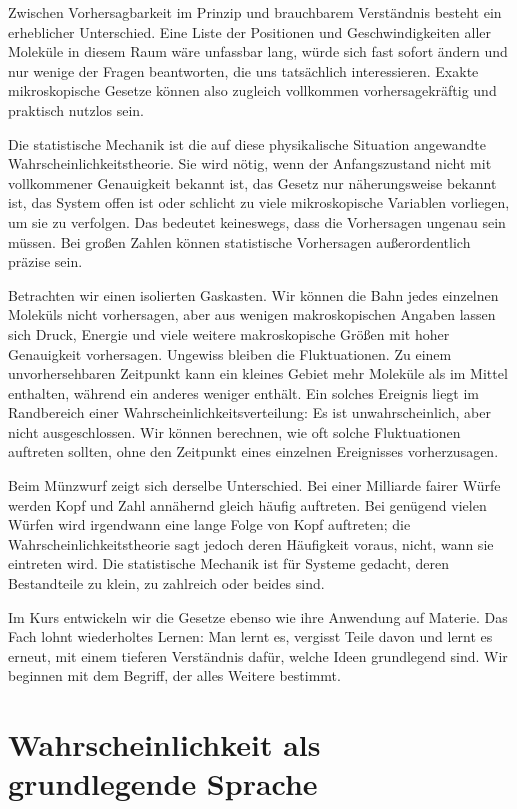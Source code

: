 Zwischen Vorhersagbarkeit im Prinzip und brauchbarem Verständnis besteht ein erheblicher Unterschied. Eine Liste der Positionen und Geschwindigkeiten aller Moleküle in diesem Raum wäre unfassbar lang, würde sich fast sofort ändern und nur wenige der Fragen beantworten, die uns tatsächlich interessieren. Exakte mikroskopische Gesetze können also zugleich vollkommen vorhersagekräftig und praktisch nutzlos sein.

Die statistische Mechanik ist die auf diese physikalische Situation angewandte Wahrscheinlichkeitstheorie. Sie wird nötig, wenn der Anfangszustand nicht mit vollkommener Genauigkeit bekannt ist, das Gesetz nur näherungsweise bekannt ist, das System offen ist oder schlicht zu viele mikroskopische Variablen vorliegen, um sie zu verfolgen. Das bedeutet keineswegs, dass die Vorhersagen ungenau sein müssen. Bei großen Zahlen können statistische Vorhersagen außerordentlich präzise sein.

Betrachten wir einen isolierten Gaskasten. Wir können die Bahn jedes einzelnen Moleküls nicht vorhersagen, aber aus wenigen makroskopischen Angaben lassen sich Druck, Energie und viele weitere makroskopische Größen mit hoher Genauigkeit vorhersagen. Ungewiss bleiben die Fluktuationen. Zu einem unvorhersehbaren Zeitpunkt kann ein kleines Gebiet mehr Moleküle als im Mittel enthalten, während ein anderes weniger enthält. Ein solches Ereignis liegt im Randbereich einer Wahrscheinlichkeitsverteilung: Es ist unwahrscheinlich, aber nicht ausgeschlossen. Wir können berechnen, wie oft solche Fluktuationen auftreten sollten, ohne den Zeitpunkt eines einzelnen Ereignisses vorherzusagen.

Beim Münzwurf zeigt sich derselbe Unterschied. Bei einer Milliarde fairer Würfe werden Kopf und Zahl annähernd gleich häufig auftreten. Bei genügend vielen Würfen wird irgendwann eine lange Folge von Kopf auftreten; die Wahrscheinlichkeitstheorie sagt jedoch deren Häufigkeit voraus, nicht, wann sie eintreten wird. Die statistische Mechanik ist für Systeme gedacht, deren Bestandteile zu klein, zu zahlreich oder beides sind.

Im Kurs entwickeln wir die Gesetze ebenso wie ihre Anwendung auf Materie. Das Fach lohnt wiederholtes Lernen: Man lernt es, vergisst Teile davon und lernt es erneut, mit einem tieferen Verständnis dafür, welche Ideen grundlegend sind. Wir beginnen mit dem Begriff, der alles Weitere bestimmt.

\section{Wahrscheinlichkeit als grundlegende Sprache}

